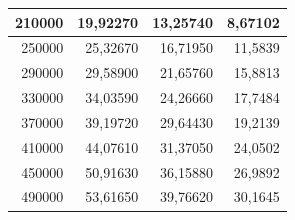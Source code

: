 \documentclass[a4paper, 12pt]{article}
\begin{document}
\begin{longtable}[c]{@{}rrrr@{}}
		\multicolumn{1}{|r|}{210000}                  & \multicolumn{1}{r|}{19,92270}               & \multicolumn{1}{r|}{13,25740}                                                          & \multicolumn{1}{r|}{8,67102}                                                           \\* \midrule
		\multicolumn{1}{|r|}{250000}                  & \multicolumn{1}{r|}{25,32670}               & \multicolumn{1}{r|}{16,71950}                                                          & \multicolumn{1}{r|}{11,5839}                                                           \\* \midrule
		\multicolumn{1}{|r|}{290000}                  & \multicolumn{1}{r|}{29,58900}               & \multicolumn{1}{r|}{21,65760}                                                          & \multicolumn{1}{r|}{15,8813}                                                           \\* \midrule
		\multicolumn{1}{|r|}{330000}                  & \multicolumn{1}{r|}{34,03590}               & \multicolumn{1}{r|}{24,26660}                                                          & \multicolumn{1}{r|}{17,7484}                                                           \\* \midrule
		\multicolumn{1}{|r|}{370000}                  & \multicolumn{1}{r|}{39,19720}               & \multicolumn{1}{r|}{29,64430}                                                          & \multicolumn{1}{r|}{19,2139}                                                           \\* \midrule
		\multicolumn{1}{|r|}{410000}                  & \multicolumn{1}{r|}{44,07610}               & \multicolumn{1}{r|}{31,37050}                                                          & \multicolumn{1}{r|}{24,0502}                                                           \\* \midrule
		\multicolumn{1}{|r|}{450000}                  & \multicolumn{1}{r|}{50,91630}               & \multicolumn{1}{r|}{36,15880}                                                          & \multicolumn{1}{r|}{26,9892}                                                           \\* \midrule
		\multicolumn{1}{|r|}{490000}                  & \multicolumn{1}{r|}{53,61650}               & \multicolumn{1}{r|}{39,76620}                                                          & \multicolumn{1}{r|}{30,1645}                                                           \\* \midrule

\end{longtable}
\end{document}

